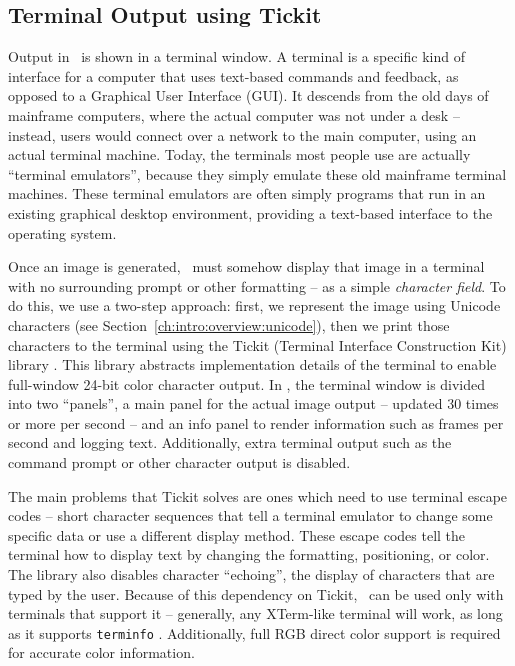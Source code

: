 \subsection{Terminal Output using Tickit}
\label{ch:intro:overview:libtickit}

Output in \name\ is shown in a terminal window.
A terminal is a specific kind of interface for a computer that uses text-based commands and feedback, as opposed to a Graphical User Interface (GUI).
It descends from the old days of mainframe computers, where the actual computer was not under a desk -- instead, users would connect over a network to the main computer, using an actual terminal machine.
Today, the terminals most people use are actually ``terminal emulators'', because they simply emulate these old mainframe terminal machines.
These terminal emulators are often simply programs that run in an existing graphical desktop environment, providing a text-based interface to the operating system.

Once an image is generated, \name\ must somehow display that image in a terminal with no surrounding prompt or other formatting -- as a simple {\it character field}.
To do this, we use a two-step approach: first, we represent the image using Unicode characters (see Section~\ref{ch:intro:overview:unicode}), then we print those characters to the terminal using the Tickit (Terminal Interface Construction Kit) library \cite{libtickitLibrary}.
This library abstracts implementation details of the terminal to enable full-window 24-bit color character output.
In \name, the terminal window is divided into two ``panels'', a main panel for the actual image output -- updated 30 times or more per second -- and an info panel to render information such as frames per second and logging text.
Additionally, extra terminal output such as the command prompt or other character output is disabled.

The main problems that Tickit solves are ones which need to use terminal escape codes -- short character sequences that tell a terminal emulator to change some specific data or use a different display method.
These escape codes tell the terminal how to display text by changing the formatting, positioning, or color.
The library also disables character ``echoing'', the display of characters that are typed by the user.
Because of this dependency on Tickit, \name\ can be used only with terminals that support it -- generally, any XTerm-like terminal will work, as long as it supports \texttt{terminfo} \cite{libtickitLibrary}.
Additionally, full RGB direct color support is required for accurate color information.

